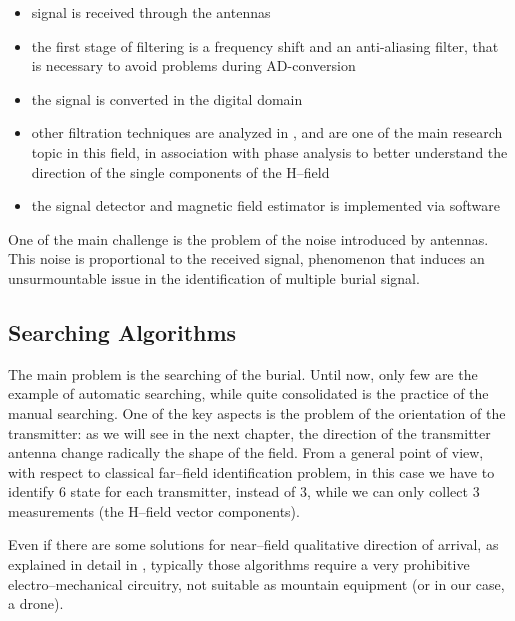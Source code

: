\begin{itemize}
\item signal is received through the antennas
\item the first stage of filtering is a frequency shift and  an anti-aliasing filter, that is necessary to avoid problems during AD-conversion
\item the signal is converted in the digital domain
\item other filtration techniques are analyzed  in \citep{Salos2007}, and are one of the main research topic in this field, in association with phase analysis to better understand the direction of the single components of the H--field
\item the signal detector and magnetic field estimator is implemented via software
\end{itemize}

One of the main challenge is the problem of the noise introduced by antennas. This noise is proportional to the received signal, phenomenon that induces an unsurmountable issue in the identification of multiple burial signal.

\subsection{Searching Algorithms}

The main problem is the searching of the burial. Until now, only few are the example of automatic searching, while quite consolidated is the practice of the manual searching. One of the key aspects is the problem of the orientation of the transmitter: as we will see in the next chapter, the direction of the transmitter antenna change radically the shape of the field. From a general point of view, with respect to classical far--field identification problem, in this case we have to identify 6 state for each transmitter, instead of 3, while we can only collect 3 measurements (the H--field vector components).

Even if there are some solutions for near--field qualitative direction of arrival, as explained in detail in \citep{hutchinson2000arrl}, typically those algorithms require a very prohibitive electro--mechanical circuitry, not suitable as mountain equipment (or in our case, a drone).

